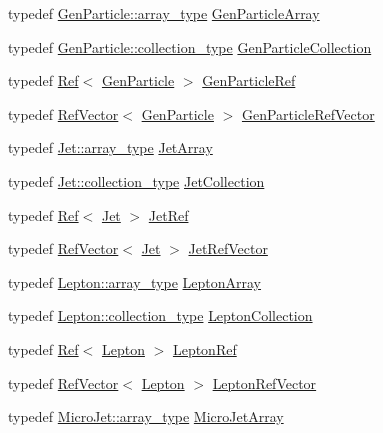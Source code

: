 \begin{DoxyCompactItemize}
\item 
typedef \hyperlink{classpanda_1_1Array}{GenParticle::array\_\-type} \hyperlink{namespacepanda_a2b72dce1b15a3c68886fe8de0aad88d3}{GenParticleArray}
\item 
typedef \hyperlink{classpanda_1_1Collection}{GenParticle::collection\_\-type} \hyperlink{namespacepanda_acc1526558d791db03ba031527662ef5b}{GenParticleCollection}
\item 
typedef \hyperlink{classpanda_1_1Ref}{Ref}$<$ \hyperlink{classpanda_1_1GenParticle}{GenParticle} $>$ \hyperlink{namespacepanda_ae0ab9f621218fc75452057f414235ffb}{GenParticleRef}
\item 
typedef \hyperlink{classpanda_1_1RefVector}{RefVector}$<$ \hyperlink{classpanda_1_1GenParticle}{GenParticle} $>$ \hyperlink{namespacepanda_a104343ab623686b03b2bc14bb25628a9}{GenParticleRefVector}
\item 
typedef \hyperlink{classpanda_1_1Array}{Jet::array\_\-type} \hyperlink{namespacepanda_ad40d6bc31b82b5dbce3920e75adab89f}{JetArray}
\item 
typedef \hyperlink{classpanda_1_1Collection}{Jet::collection\_\-type} \hyperlink{namespacepanda_a294a96c278d908b10e4f1489e3195477}{JetCollection}
\item 
typedef \hyperlink{classpanda_1_1Ref}{Ref}$<$ \hyperlink{classpanda_1_1Jet}{Jet} $>$ \hyperlink{namespacepanda_a43eb57272d3c7308490209033e133e55}{JetRef}
\item 
typedef \hyperlink{classpanda_1_1RefVector}{RefVector}$<$ \hyperlink{classpanda_1_1Jet}{Jet} $>$ \hyperlink{namespacepanda_a5ce2fe1f4e03ac599e364d18e4385878}{JetRefVector}
\item 
typedef \hyperlink{classpanda_1_1Array}{Lepton::array\_\-type} \hyperlink{namespacepanda_a352f1280da7ec8487c4925e39d067e8d}{LeptonArray}
\item 
typedef \hyperlink{classpanda_1_1Collection}{Lepton::collection\_\-type} \hyperlink{namespacepanda_ac1e22e7d8b50cda812e91c0b79c467fb}{LeptonCollection}
\item 
typedef \hyperlink{classpanda_1_1Ref}{Ref}$<$ \hyperlink{classpanda_1_1Lepton}{Lepton} $>$ \hyperlink{namespacepanda_a016f3e7c0e8914121bb07d9619dfee8b}{LeptonRef}
\item 
typedef \hyperlink{classpanda_1_1RefVector}{RefVector}$<$ \hyperlink{classpanda_1_1Lepton}{Lepton} $>$ \hyperlink{namespacepanda_a494bd902cbae8bbd1171f3d8d7f64bf1}{LeptonRefVector}
\item 
typedef \hyperlink{classpanda_1_1Array}{MicroJet::array\_\-type} \hyperlink{namespacepanda_a63773b13485efcf04c5c4f05ec063a72}{MicroJetArray}

\end{DoxyCompactItemize}
